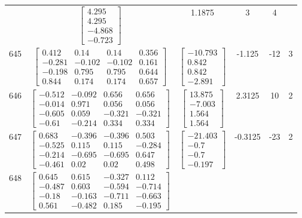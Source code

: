 \documentclass[a4paper,12pt]{article}
\begin{document}
\begin{tabular}{c c c c c c}
&
$\begin{bmatrix} 4.295 \\ 4.295 \\ -4.868 \\ -0.723 \end{bmatrix}$
&
1.1875
&
3
&
4
\\
645
&
$\begin{bmatrix} 0.412 & 0.14 & 0.14 & 0.356 \\ -0.281 & -0.102 & -0.102 & 0.161 \\ -0.198 & 0.795 & 0.795 & 0.644 \\ 0.844 & 0.174 & 0.174 & 0.657 \end{bmatrix}$
&
$\begin{bmatrix} -10.793 \\ 0.842 \\ 0.842 \\ -2.891 \end{bmatrix}$
&
-1.125
&
-12
&
3
\\
646
&
$\begin{bmatrix} -0.512 & -0.092 & 0.656 & 0.656 \\ -0.014 & 0.971 & 0.056 & 0.056 \\ -0.605 & 0.059 & -0.321 & -0.321 \\ -0.61 & -0.214 & 0.334 & 0.334 \end{bmatrix}$
&
$\begin{bmatrix} 13.875 \\ -7.003 \\ 1.564 \\ 1.564 \end{bmatrix}$
&
2.3125
&
10
&
2
\\
647
&
$\begin{bmatrix} 0.683 & -0.396 & -0.396 & 0.503 \\ -0.525 & 0.115 & 0.115 & -0.284 \\ -0.214 & -0.695 & -0.695 & 0.647 \\ -0.461 & 0.02 & 0.02 & 0.498 \end{bmatrix}$
&
$\begin{bmatrix} -21.403 \\ -0.7 \\ -0.7 \\ -0.197 \end{bmatrix}$
&
-0.3125
&
-23
&
2
\\
648
&
$\begin{bmatrix} 0.645 & 0.615 & -0.327 & 0.112 \\ -0.487 & 0.603 & -0.594 & -0.714 \\ -0.18 & -0.163 & -0.711 & -0.663 \\ 0.561 & -0.482 & 0.185 & -0.195 \end{bmatrix}$

\end{tabular}
\end{document}
